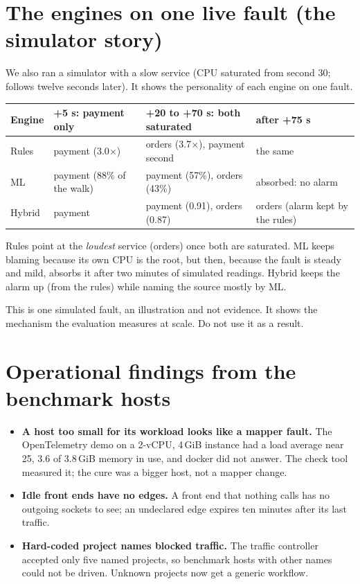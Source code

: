 \section{The engines on one live fault (the simulator story)}
\begin{simplebox}
We also ran a simulator with a slow  service (CPU saturated from second 30;  follows twelve seconds later). It shows the personality of each engine on one fault.

\begin{center}
\small
\begin{tabularx}{\textwidth}{>{\raggedright\arraybackslash}p{1.6cm}>{\raggedright\arraybackslash}X>{\raggedright\arraybackslash}X>{\raggedright\arraybackslash}X}
\toprule
Engine & +5 s: payment only & +20 to +70 s: both saturated & after +75 s\\
\midrule
Rules & payment (3.0$\times$) & orders (3.7$\times$), payment second & the same\\
ML & payment (88\% of the walk) & payment (57\%), orders (43\%) & absorbed: no alarm\\
Hybrid & payment & payment (0.91), orders (0.87) & orders (alarm kept by the rules)\\
\bottomrule
\end{tabularx}
\end{center}

Rules point at the \emph{loudest} service (orders) once both are saturated. ML keeps blaming  because its own CPU is the root, but then, because the fault is steady and mild, absorbs it after two minutes of simulated readings. Hybrid keeps the alarm up (from the rules) while naming the source mostly by ML.
\end{simplebox}

\begin{warnbox}
This is one simulated fault, an illustration and not evidence. It shows the mechanism the evaluation measures at scale. Do not use it as a result.
\end{warnbox}

\section{Operational findings from the benchmark hosts}
\begin{itemize}
\item \textbf{A host too small for its workload looks like a mapper fault.} The OpenTelemetry demo on a 2-vCPU, 4\,GiB instance had a load average near 25, 3.6 of 3.8\,GiB memory in use, and docker did not answer. The check tool measured it; the cure was a bigger host, not a mapper change.
\item \textbf{Idle front ends have no edges.} A front end that nothing calls has no outgoing sockets to see; an undeclared edge expires ten minutes after its last traffic.
\item \textbf{Hard-coded project names blocked traffic.} The traffic controller accepted only five named projects, so benchmark hosts with other names could not be driven. Unknown projects now get a generic workflow.
\end{itemize}

